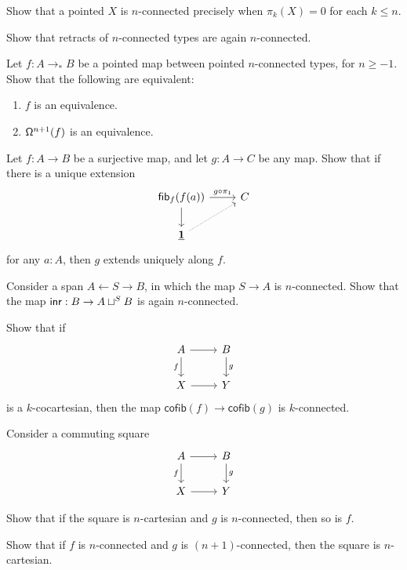 \begin{exercises}
\item Show that a pointed $X$ is $n$-connected precisely when $\pi_k(X)=0$ for each $k\leq n$.
\item Show that retracts of $n$-connected types are again $n$-connected.
\item Let $f:A\to_\ast B$ be a pointed map between pointed $n$-connected types, for $n\geq -1$. Show that the following are equivalent:
\begin{enumerate}
\item $f$ is an equivalence.
\item $\loopspace[n+1]{f}$ is an equivalence. 
\end{enumerate}
\item Let $f:A\to B$ be a surjective map, and let $g:A\to C$ be any map. Show that if there is a unique extension
\begin{equation*}
\begin{tikzcd}
\fib{f}{f(a)} \arrow[r,"g\circ\pi_1"] \arrow[d] & C \\
\unit \arrow[ur,densely dotted]
\end{tikzcd}
\end{equation*}
for any $a:A$, then $g$ extends uniquely along $f$.
\item Consider a span $A \leftarrow S \rightarrow B$, in which the map $S\to A$ is $n$-connected. Show that the map $\inr : B\to A\sqcup^S B$ is again $n$-connected.
\item Show that if
\begin{equation*}
\begin{tikzcd}
A \arrow[r] \arrow[d,swap,"f"] & B \arrow[d,"g"] \\
X \arrow[r] & Y
\end{tikzcd}
\end{equation*}
is a $k$-cocartesian, then the map $\mathsf{cofib}(f)\to \mathsf{cofib}(g)$ is $k$-connected.
\item Consider a commuting square
\begin{equation*}
\begin{tikzcd}
A \arrow[d,swap,"f"] \arrow[r] & B \arrow[d,"g"] \\
X \arrow[r] & Y
\end{tikzcd}
\end{equation*}
\begin{subexenum}
\item Show that if the square is $n$-cartesian and $g$ is $n$-connected, then so is $f$.
\item Show that if $f$ is $n$-connected and $g$ is $(n+1)$-connected, then the square is $n$-cartesian. 

\end{subexenum}
\end{exercises}
